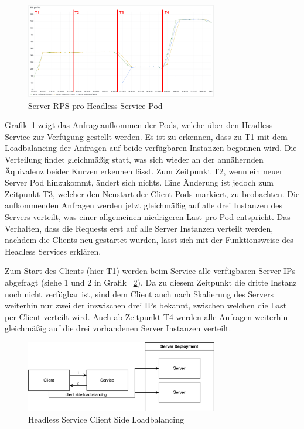 \begin{figure}[H]
    \centering
    \includegraphics[width=0.75\textwidth]{img/headless_rps}
    \caption{Server RPS pro Headless Service Pod}
    \label{fig:headless_rps}
\end{figure}

Grafik~\ref{fig:headless_rps} zeigt das Anfrageaufkommen der Pods, welche über den Headless Service zur Verfügung gestellt werden.
Es ist zu erkennen, dass zu T1 mit dem Loadbalancing der Anfragen auf beide verfügbaren Instanzen begonnen wird.
Die Verteilung findet gleichmäßig statt, was sich wieder an der annähernden Äquivalenz beider Kurven erkennen lässt.
Zum Zeitpunkt T2, wenn ein neuer Server Pod hinzukommt, ändert sich nichts.
Eine Änderung ist jedoch zum Zeitpunkt T3, welcher den Neustart der Client Pods markiert, zu beobachten.
Die aufkommenden Anfragen werden jetzt gleichmäßig auf alle drei Instanzen des Servers verteilt, was einer allgemeinen niedrigeren Last pro Pod entspricht.
Das Verhalten, dass die Requests erst auf alle Server Instanzen verteilt werden, nachdem die Clients neu gestartet wurden, lässt sich mit der Funktionsweise des Headless Services erklären.

Zum Start des Clients (hier T1) werden beim Service alle verfügbaren Server IPs abgefragt (siehe 1 und 2 in Grafik ~\ref{fig:headless_loadbalancing}).
Da zu diesem Zeitpunkt die dritte Instanz noch nicht verfügbar ist, sind dem Client auch nach Skalierung des Servers weiterhin nur zwei der inzwischen drei IPs bekannt, zwischen welchen die Last per Client verteilt wird.
Auch ab Zeitpunkt T4 werden alle Anfragen weiterhin gleichmäßig auf die drei vorhandenen Server Instanzen verteilt.

\begin{figure}[H]
    \centering
    \includegraphics[width=0.75\textwidth]{img/headless_loadbalancing}
    \caption{Headless Service Client Side Loadbalancing}
    \label{fig:headless_loadbalancing}
\end{figure}

